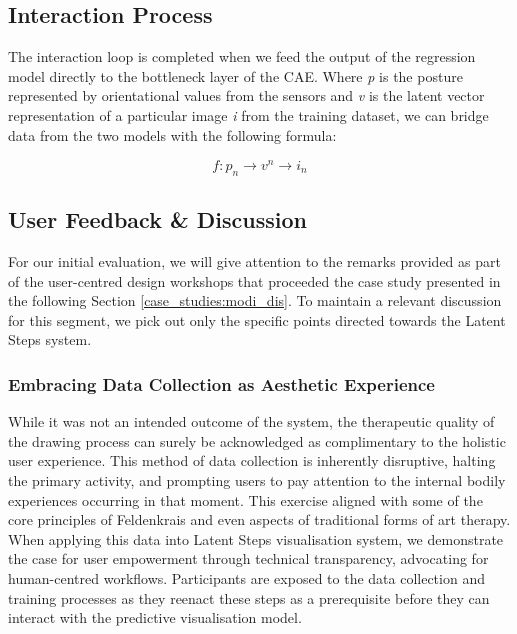 \subsection{Interaction Process}

The interaction loop is completed when we feed the output of the regression model directly to the bottleneck layer of the CAE. Where \textit{p} is the posture represented by orientational values from the sensors and \textit{v} is the latent vector representation of a particular image \textit{i} from the training dataset, we can bridge data from the two models with the following formula:

\[ f:p_n\xrightarrow{}v^n \xrightarrow{}i_n \]

\subsection{User Feedback \& Discussion}

For our initial evaluation, we will give attention to the remarks provided as part of the user-centred design workshops that proceeded the case study presented in the following Section \ref{case_studies:modi_dis}. To maintain a relevant discussion for this segment, we pick out only the specific points directed towards the Latent Steps system.

\subsubsection{Embracing Data Collection as Aesthetic Experience}

While it was not an intended outcome of the system, the therapeutic quality of the drawing process can surely be acknowledged as complimentary to the holistic user experience. This method of data collection is inherently disruptive, halting the primary activity, and prompting users to pay attention to the internal bodily experiences occurring in that moment. This exercise aligned with some of the core principles of Feldenkrais and even aspects of traditional forms of art therapy. When applying this data into Latent Steps visualisation system, we demonstrate the case for user empowerment through technical transparency, advocating for human-centred workflows. Participants are exposed to the data collection and training processes as they reenact these steps as a prerequisite before they can interact with the predictive visualisation model.

